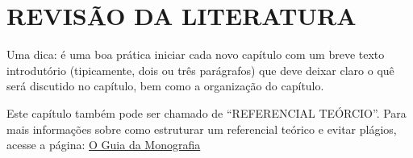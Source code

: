 
\chapter{REVISÃO DA LITERATURA}
\label{chap:fundamentacaoTeorica}

Uma dica: é uma boa prática iniciar cada novo capítulo com um breve texto introdutório (tipicamente, dois ou três parágrafos) que deve deixar claro o quê será discutido no capítulo, bem como a organização do capítulo.

Este capítulo também pode ser chamado de ``REFERENCIAL TEÓRCIO''. Para mais informações sobre como estruturar um referencial teórico e evitar plágios, acesse a página: \href{https://guiadamonografia.com.br/como-fazer-referencial-teorico/}{O Guia da Monografia}



